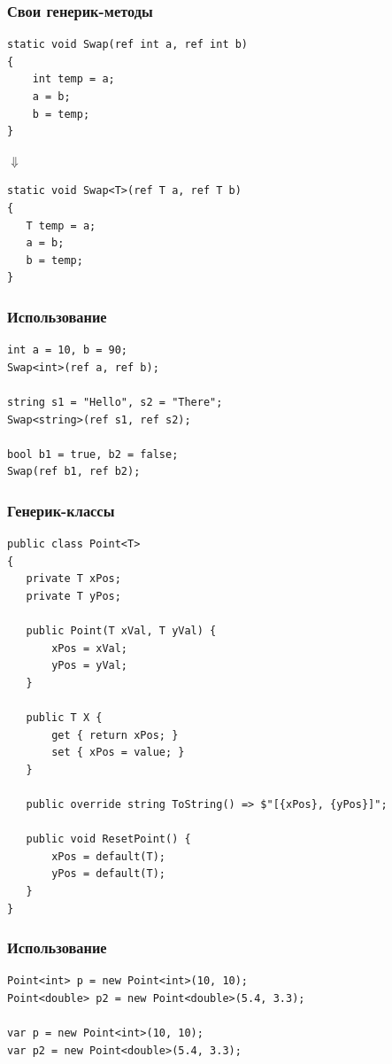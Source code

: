\documentclass{../../slides-style}
\begin{document}
    \begin{frame}[fragile]
        \frametitle{Свои генерик-методы}
        \begin{verbatim}
static void Swap(ref int a, ref int b)
{
    int temp = a;
    a = b;
    b = temp;
}
        \end{verbatim}
        \hspace{2cm} $\Downarrow$
        \begin{verbatim}
static void Swap<T>(ref T a, ref T b)
{
   T temp = a;
   a = b;
   b = temp;
}
        \end{verbatim}
    \end{frame}

    \begin{frame}[fragile]
        \frametitle{Использование}
        \begin{verbatim}
int a = 10, b = 90;
Swap<int>(ref a, ref b);

string s1 = "Hello", s2 = "There";
Swap<string>(ref s1, ref s2);

bool b1 = true, b2 = false;
Swap(ref b1, ref b2);
        \end{verbatim}
    \end{frame}

    \begin{frame}[fragile]
        \frametitle{Генерик-классы}
        \begin{scriptsize}
            \begin{verbatim}
public class Point<T>
{
   private T xPos;
   private T yPos;

   public Point(T xVal, T yVal) {
       xPos = xVal;
       yPos = yVal;
   }
   
   public T X {
       get { return xPos; }
       set { xPos = value; }
   }

   public override string ToString() => $"[{xPos}, {yPos}]";

   public void ResetPoint() {
       xPos = default(T);
       yPos = default(T);
   }
}
            \end{verbatim}
        \end{scriptsize}
    \end{frame}

    \begin{frame}[fragile]
        \frametitle{Использование}
        \begin{verbatim}
Point<int> p = new Point<int>(10, 10);
Point<double> p2 = new Point<double>(5.4, 3.3);

var p = new Point<int>(10, 10);
var p2 = new Point<double>(5.4, 3.3);
        \end{verbatim}
    \end{frame}
\end{document}

